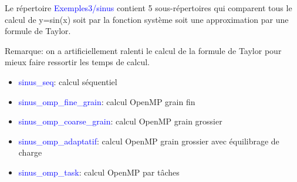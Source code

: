 \documentclass{beamer}
\begin{document}
\begin{frame}
	Le répertoire \textcolor{blue}{Exemples3/sinus} contient 5 sous-répertoires
	qui comparent tous le calcul de y=sin(x) soit par la fonction système soit une approximation par une formule de Taylor.
	\medskip
	
	Remarque: on a artificiellement ralenti le calcul de la formule de Taylor pour mieux faire ressortir les temps de calcul.
	
	\begin{itemize}
		\item \textcolor{blue}{sinus\_seq}: calcul séquentiel
		\item \textcolor{blue}{sinus\_omp\_fine\_grain}: calcul OpenMP grain fin
		\item \textcolor{blue}{sinus\_omp\_coarse\_grain}: calcul OpenMP grain grossier
		\item \textcolor{blue}{sinus\_omp\_adaptatif}: calcul OpenMP grain grossier avec équilibrage de charge
		\item \textcolor{blue}{sinus\_omp\_task}: calcul OpenMP par tâches
	\end{itemize}

\vfill

\end{frame}

\begin{frame}

\end{frame}
\end{document}
